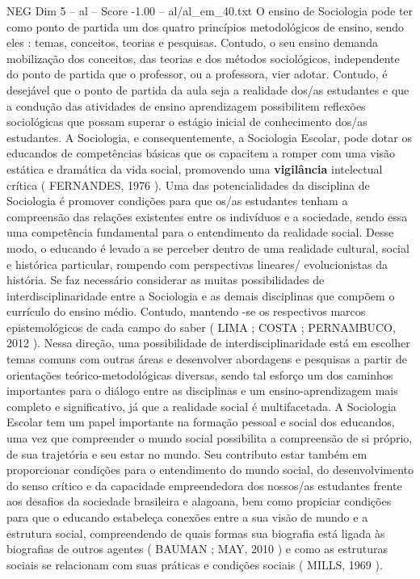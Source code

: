 \begin{textsample}{NEG Dim 5 – al – Score -1.00 – al/al\_em\_40.txt}
O ensino de Sociologia pode ter como ponto de partida um dos quatro princípios metodológicos de ensino, sendo eles : temas, conceitos, teorias e pesquisas.
Contudo, o seu ensino demanda mobilização dos conceitos, das teorias e dos métodos sociológicos, independente do ponto de partida que o professor, ou a professora, vier adotar.
Contudo, é desejável que o ponto de partida da aula seja a realidade dos/as estudantes e que a condução das atividades de ensino aprendizagem possibilitem reflexões sociológicas que possam superar o estágio inicial de conhecimento dos/as estudantes.
A Sociologia, e consequentemente, a Sociologia Escolar, pode dotar os educandos de competências básicas que os capacitem a romper com uma visão estática e dramática da vida social, promovendo uma \textbf{vigilância} intelectual crítica ( FERNANDES, 1976 ).
Uma das potencialidades da disciplina de Sociologia é promover condições para que os/as estudantes tenham a compreensão das relações existentes entre os indivíduos e a sociedade, sendo essa uma competência fundamental para o entendimento da realidade social.
Desse modo, o educando é levado a se perceber dentro de uma realidade cultural, social e histórica particular, rompendo com perspectivas lineares/ evolucionistas da história.
Se faz necessário considerar as muitas possibilidades de interdisciplinaridade entre a Sociologia e as demais disciplinas que compõem o currículo do ensino médio.
Contudo, mantendo -se os respectivos marcos epistemológicos de cada campo do saber ( LIMA ; COSTA ; PERNAMBUCO, 2012 ).
Nessa direção, uma possibilidade de interdisciplinaridade está em escolher temas comuns com outras áreas e desenvolver abordagens e pesquisas a partir de orientações teórico-metodológicas diversas, sendo tal esforço um dos caminhos importantes para o diálogo entre as disciplinas e um ensino-aprendizagem mais completo e significativo, já que a realidade social é multifacetada.
A Sociologia Escolar tem um papel importante na formação pessoal e social dos educandos, uma vez que compreender o mundo social possibilita a compreensão de si próprio, de sua trajetória e seu estar no mundo.
Seu contributo estar também em proporcionar condições para o entendimento do mundo social, do desenvolvimento do senso crítico e da capacidade empreendedora dos nossos/as estudantes frente aos desafios da sociedade brasileira e alagoana, bem como propiciar condições para que o educando estabeleça conexões entre a sua visão de mundo e a estrutura social, compreendendo de quais formas sua biografia está ligada às biografias de outros agentes ( BAUMAN ; MAY, 2010 ) e como as estruturas sociais se relacionam com suas práticas e condições sociais ( MILLS, 1969 ).

\end{textsample}
